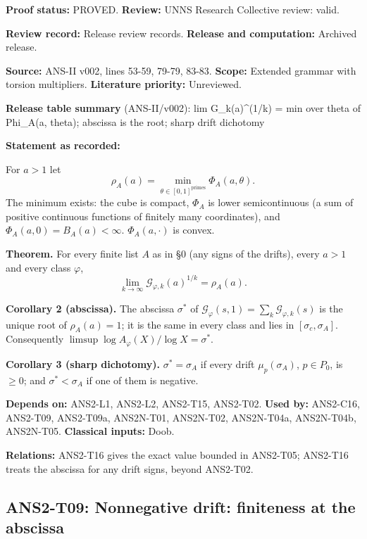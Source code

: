 \documentclass[
  11pt,
]{article}
\begin{document}
\textbf{Proof status:} PROVED. \textbf{Review:} UNNS Research Collective
review: valid.

\textbf{Review record:} Release review records. \textbf{Release and
computation:} Archived release.

\textbf{Source:} ANS-II v002, lines 53-59, 79-79, 83-83. \textbf{Scope:}
Extended grammar with torsion multipliers. \textbf{Literature priority:}
Unreviewed.

\textbf{Release table summary} (ANS-II/v002): lim G\_k(a)\^{}(1/k) = min
over theta of Phi\_A(a, theta); abscissa is the root; sharp drift
dichotomy

\textbf{Statement as recorded:}

For \(a>1\) let
\[\rho_A(a)=\min_{\theta\in[0,1]^{\text{primes}}}\Phi_A(a,\theta).\] The
minimum exists: the cube is compact, \(\Phi_A\) is lower semicontinuous
(a sum of positive continuous functions of finitely many coordinates),
and \(\Phi_A(a,0)=B_A(a)<\infty\). \(\Phi_A(a,\cdot)\) is convex.

\textbf{Theorem.} For every finite list \(A\) as in §0 (any signs of the
drifts), every \(a>1\) and every class \(\varphi\),
\[\lim_{k\to\infty}\mathcal G_{\varphi,k}(a)^{1/k}=\rho_A(a).\]

\textbf{Corollary 2 (abscissa).} The abscissa \(\sigma^\ast\) of
\(\mathcal G_\varphi(s,1)=\sum_k\mathcal G_{\varphi,k}(s)\) is the
unique root of \(\rho_A(a)=1\); it is the same in every class and lies
in \([\sigma_c,\sigma_A]\). Consequently
\(\limsup\log A_\varphi(X)/\log X=\sigma^\ast\).

\textbf{Corollary 3 (sharp dichotomy).} \(\sigma^\ast=\sigma_A\) if
every drift \(\mu_p(\sigma_A)\), \(p\in P_0\), is \(\ge0\); and
\(\sigma^\ast<\sigma_A\) if one of them is negative.

\textbf{Depends on:} ANS2-L1, ANS2-L2, ANS2-T15, ANS2-T02. \textbf{Used
by:} ANS2-C16, ANS2-T09, ANS2-T09a, ANS2N-T01, ANS2N-T02, ANS2N-T04a,
ANS2N-T04b, ANS2N-T05. \textbf{Classical inputs:} Doob.

\textbf{Relations:} ANS2-T16 gives the exact value bounded in ANS2-T05;
ANS2-T16 treats the abscissa for any drift signs, beyond ANS2-T02.

\hypertarget{ans2-t09-nonnegative-drift-finiteness-at-the-abscissa}{%
\subsection{ANS2-T09: Nonnegative drift: finiteness at the
abscissa}\label{ans2-t09-nonnegative-drift-finiteness-at-the-abscissa}}
\end{document}
